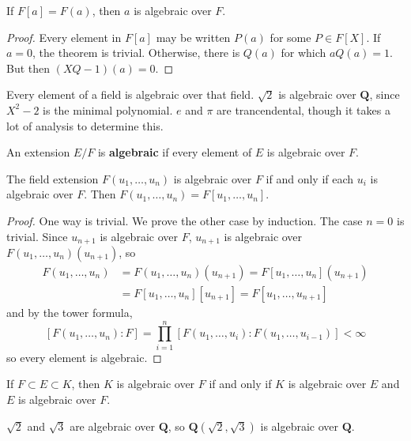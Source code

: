 \begin{lemma}
    If $F[a] = F(a)$, then $a$ is algebraic over $F$.
\end{lemma}
\begin{proof}
    Every element in $F[a]$ may be written $P(a)$ for some $P \in F[X]$. If $a = 0$, the theorem is trivial. Otherwise, there is $Q(a)$ for which $aQ(a) = 1$. But then $(XQ - 1)(a) = 0$.
\end{proof}

\begin{example}
    Every element of a field is algebraic over that field. $\sqrt{2}$ is algebraic over $\mathbf{Q}$, since $X^2 - 2$ is the minimal polynomial. $e$ and $\pi$ are trancendental, though it takes a lot of analysis to determine this.
\end{example}

An extension $E/F$ is {\bf algebraic} if every element of $E$ is algebraic over $F$.

\begin{theorem}
    The field extension $F(u_1, \dots, u_n)$ is algebraic over $F$ if and only if each $u_i$ is algebraic over $F$. Then $F(u_1, \dots, u_n) = F[u_1, \dots, u_n]$.
\end{theorem}
\begin{proof}
    One way is trivial. We prove the other case by induction. The case $n = 0$ is trivial. Since $u_{n+1}$ is algebraic over $F$, $u_{n+1}$ is algebraic over $F(u_1, \dots, u_n)(u_{n+1})$, so
    \begin{align*}
        F(u_1, \dots, u_n) &= F(u_1, \dots, u_n)(u_{n+1}) = F[u_1, \dots, u_n](u_{n+1})\\
        &= F[u_1, \dots, u_n][u_{n+1}] = F[u_1, \dots, u_{n+1}]
    \end{align*}
    and by the tower formula,
    \[ [F(u_1, \dots, u_n): F] = \prod_{i = 1}^n [F(u_1, \dots, u_i) : F(u_1, \dots, u_{i-1})] < \infty \]
    so every element is algebraic.
\end{proof}

\begin{corollary}
    If $F \subset E \subset K$, then $K$ is algebraic over $F$ if and only if $K$ is algebraic over $E$ and $E$ is algebraic over $F$.
\end{corollary}

\begin{example}
    $\sqrt{2}$ and $\sqrt{3}$ are algebraic over $\mathbf{Q}$, so $\mathbf{Q}(\sqrt{2}, \sqrt{3})$ is algebraic over $\mathbf{Q}$.
\end{example}

